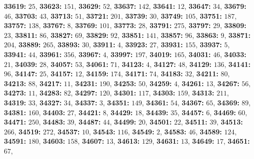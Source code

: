 \textsf{\bfseries 33619:} $25$, \textsf{\bfseries 33623:} $151$, \textsf{\bfseries 33629:} $52$, \textsf{\bfseries 33637:} $142$, \textsf{\bfseries 33641:} $12$, \textsf{\bfseries 33647:} $34$, \textsf{\bfseries 33679:} $46$, \textsf{\bfseries 33703:} $43$, \textsf{\bfseries 33713:} $51$, \textsf{\bfseries 33721:} $201$, \textsf{\bfseries 33739:} $30$, \textsf{\bfseries 33749:} $105$, \textsf{\bfseries 33751:} $187$, \textsf{\bfseries 33757:} $138$, \textsf{\bfseries 33767:} $8$, \textsf{\bfseries 33769:} $101$, \textsf{\bfseries 33773:} $28$, \textsf{\bfseries 33791:} $275$, \textsf{\bfseries 33797:} $29$, \textsf{\bfseries 33809:} $23$, \textsf{\bfseries 33811:} $86$, \textsf{\bfseries 33827:} $69$, \textsf{\bfseries 33829:} $92$, \textsf{\bfseries 33851:} $141$, \textsf{\bfseries 33857:} $96$, \textsf{\bfseries 33863:} $9$, \textsf{\bfseries 33871:} $204$, \textsf{\bfseries 33889:} $265$, \textsf{\bfseries 33893:} $30$, \textsf{\bfseries 33911:} $4$, \textsf{\bfseries 33923:} $27$, \textsf{\bfseries 33931:} $155$, \textsf{\bfseries 33937:} $5$, \textsf{\bfseries 33941:} $44$, \textsf{\bfseries 33961:} $356$, \textsf{\bfseries 33967:} $4$, \textsf{\bfseries 33997:} $197$, \textsf{\bfseries 34019:} $165$, \textsf{\bfseries 34031:} $46$, \textsf{\bfseries 34033:} $21$, \textsf{\bfseries 34039:} $28$, \textsf{\bfseries 34057:} $53$, \textsf{\bfseries 34061:} $71$, \textsf{\bfseries 34123:} $4$, \textsf{\bfseries 34127:} $48$, \textsf{\bfseries 34129:} $136$, \textsf{\bfseries 34141:} $96$, \textsf{\bfseries 34147:} $25$, \textsf{\bfseries 34157:} $12$, \textsf{\bfseries 34159:} $174$, \textsf{\bfseries 34171:} $74$, \textsf{\bfseries 34183:} $32$, \textsf{\bfseries 34211:} $80$, \textsf{\bfseries 34213:} $88$, \textsf{\bfseries 34217:} $11$, \textsf{\bfseries 34231:} $190$, \textsf{\bfseries 34253:} $50$, \textsf{\bfseries 34259:} $4$, \textsf{\bfseries 34261:} $13$, \textsf{\bfseries 34267:} $56$, \textsf{\bfseries 34273:} $11$, \textsf{\bfseries 34283:} $82$, \textsf{\bfseries 34297:} $120$, \textsf{\bfseries 34301:} $117$, \textsf{\bfseries 34303:} $159$, \textsf{\bfseries 34313:} $211$, \textsf{\bfseries 34319:} $33$, \textsf{\bfseries 34327:} $34$, \textsf{\bfseries 34337:} $3$, \textsf{\bfseries 34351:} $149$, \textsf{\bfseries 34361:} $54$, \textsf{\bfseries 34367:} $65$, \textsf{\bfseries 34369:} $89$, \textsf{\bfseries 34381:} $160$, \textsf{\bfseries 34403:} $27$, \textsf{\bfseries 34421:} $8$, \textsf{\bfseries 34429:} $18$, \textsf{\bfseries 34439:} $35$, \textsf{\bfseries 34457:} $6$, \textsf{\bfseries 34469:} $60$, \textsf{\bfseries 34471:} $250$, \textsf{\bfseries 34483:} $39$, \textsf{\bfseries 34487:} $44$, \textsf{\bfseries 34499:} $20$, \textsf{\bfseries 34501:} $22$, \textsf{\bfseries 34511:} $39$, \textsf{\bfseries 34513:} $266$, \textsf{\bfseries 34519:} $272$, \textsf{\bfseries 34537:} $10$, \textsf{\bfseries 34543:} $116$, \textsf{\bfseries 34549:} $2$, \textsf{\bfseries 34583:} $46$, \textsf{\bfseries 34589:} $124$, \textsf{\bfseries 34591:} $180$, \textsf{\bfseries 34603:} $158$, \textsf{\bfseries 34607:} $13$, \textsf{\bfseries 34613:} $129$, \textsf{\bfseries 34631:} $13$, \textsf{\bfseries 34649:} $17$, \textsf{\bfseries 34651:} $67$, 
